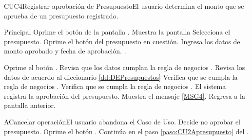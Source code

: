 	\begin{UseCase}{CUC4}{Registrar aprobación de Presupuesto}{El usuario determina el monto que se aprueba de un presupuesto registrado.}
	\end{UseCase}

	\begin{UCtrayectoria}{Principal}
			\UCpaso[\UCactor] Oprime el botón   de la pantalla .
			\UCpaso Muestra la pantalla  
			\UCpaso[\UCactor] Selecciona el presupuesto.\label{paso:CU2Apresupuesto}
      \UCpaso[\UCactor] Oprime el botón  del presupuesto en cuestión.
			\UCpaso[\UCactor] Ingresa los datos de monto aprobado y fecha de aprobación.  \label{paso:CUC4ingresarDatos}.

			\UCpaso [\UCactor] Oprime el botón  .
			\UCpaso Revisa que los datos cumplan la regla de negocios . 
			\UCpaso Revisa los datos de acuerdo al diccionario \ref{dd:DEPresupuestos} 
			\UCpaso Verifica que se cumpla la regla de negocios .  
      \UCpaso Verifica que se cumpla la regla de negocios .     
			\UCpaso El sistema registra la aprobación del presupuesto.
			\UCpaso Muestra el mensaje \ref{MSG4}.
			\UCpaso Regresa a la pantalla anterior.
	\end{UCtrayectoria}
	\newpage
	\begin{UCtrayectoriaA}{A}{Cancelar operación}{El usuario abandona el Caso de Uso.}
			\UCpaso[\UCactor] Decide no aprobar el presupuesto.
			\UCpaso[\UCactor] Oprime el botón .
			\UCpaso Continúa en el paso \ref{paso:CU2Apresupuesto} del .
	\end{UCtrayectoriaA}
		
